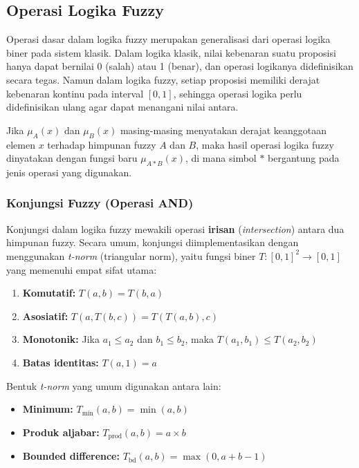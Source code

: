 \documentclass[12pt,a4paper]{article}
\theoremstyle{remark}
\begin{document}
\subsection{Operasi Logika Fuzzy}

Operasi dasar dalam logika fuzzy merupakan generalisasi dari operasi logika biner pada sistem klasik. Dalam logika klasik, nilai kebenaran suatu proposisi hanya dapat bernilai 0 (salah) atau 1 (benar), dan operasi logikanya didefinisikan secara tegas. Namun dalam logika fuzzy, setiap proposisi memiliki derajat kebenaran kontinu pada interval \([0,1]\), sehingga operasi logika perlu didefinisikan ulang agar dapat menangani nilai antara.

Jika \(\mu_A(x)\) dan \(\mu_B(x)\) masing-masing menyatakan derajat keanggotaan elemen \(x\) terhadap himpunan fuzzy \(A\) dan \(B\), maka hasil operasi logika fuzzy dinyatakan dengan fungsi baru \(\mu_{A * B}(x)\), di mana simbol \(*\) bergantung pada jenis operasi yang digunakan.

\subsubsection{Konjungsi Fuzzy (Operasi AND)}
Konjungsi dalam logika fuzzy mewakili operasi \textbf{irisan} (\textit{intersection}) antara dua himpunan fuzzy. Secara umum, konjungsi diimplementasikan dengan menggunakan \textit{t-norm} (triangular norm), yaitu fungsi biner \(T: [0,1]^2 \to [0,1]\) yang memenuhi empat sifat utama:
\begin{enumerate}
    \item \textbf{Komutatif:} \(T(a,b) = T(b,a)\)
    \item \textbf{Asosiatif:} \(T(a, T(b,c)) = T(T(a,b), c)\)
    \item \textbf{Monotonik:} Jika \(a_1 \leq a_2\) dan \(b_1 \leq b_2\), maka \(T(a_1,b_1) \leq T(a_2,b_2)\)
    \item \textbf{Batas identitas:} \(T(a,1) = a\)
\end{enumerate}

Bentuk \textit{t-norm} yang umum digunakan antara lain:
\begin{itemize}
    \item \textbf{Minimum:} \(T_{\min}(a,b) = \min(a,b)\)
    \item \textbf{Produk aljabar:} \(T_{\text{prod}}(a,b) = a \times b\)
    \item \textbf{Bounded difference:} \(T_{\text{bd}}(a,b) = \max(0, a+b-1)\)
\end{itemize}
\end{document}
